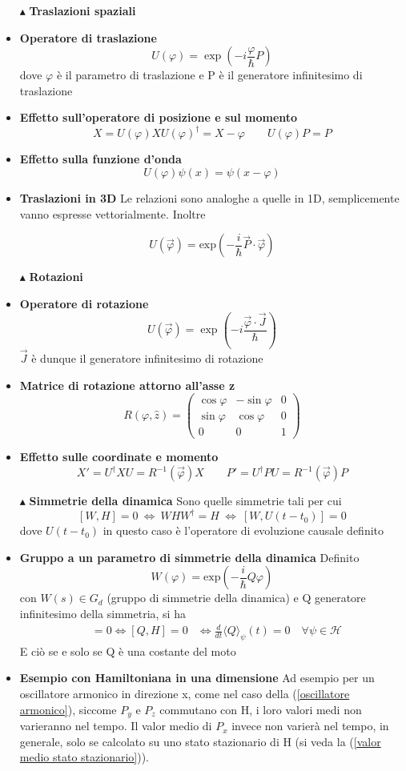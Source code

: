 \documentclass{book}
\newcommand{\g}{\textbf}
\newcommand{\e}{\begin{equation}}
\newcommand{\ex}{\end{equation} }
\renewcommand{\it}{\item[$\cdot$]}
\begin{document}
\begin{multicols}{4}
\begin{itemize}
\item [$\blacktriangle$] \g{Traslazioni spaziali}
    \it \g{Operatore di traslazione}
        \e{U(\varphi) = \exp\left(-i\frac{\varphi}{\hbar} P\right)} \ex
        dove $\varphi$ è il parametro di traslazione e P è il generatore infinitesimo di traslazione
        \it \g{Effetto sull'operatore di posizione e sul momento}
        \e{X = U(\varphi)XU(\varphi)^{\dagger} = X -\varphi \qquad U(\varphi) P = P} \ex
    \it \g{Effetto sulla funzione d'onda}
        \e{U(\varphi)\psi(x) = \psi(x - \varphi)} \ex
    \it \g{Traslazioni in 3D}
    Le relazioni sono analoghe a quelle in 1D, semplicemente vanno espresse vettorialmente. Inoltre
    
     \e{U(\vec{\varphi}) = \text{exp}\left(-\frac{i}{\hbar}\vec{P}\cdot \vec{\varphi}\right)}\ex
\item [$\blacktriangle$] \g{Rotazioni}
    \it \g{Operatore di rotazione}
        \e{U(\vec{\varphi}) = \exp\left(-i\frac{\vec{\varphi} \cdot \vec{J}}{\hbar}\right)} \ex
        $\vec{J}$ è dunque il generatore infinitesimo di rotazione
        
    \it \g{Matrice di rotazione attorno all'asse z}
        \e{R(\varphi, \hat{z}) = 
        \begin{pmatrix}
            \cos\varphi & -\sin\varphi & 0\\ 
            \sin\varphi & \cos\varphi & 0 \\
            0 & 0 & 1
        \end{pmatrix}} \ex
    \it \g{Effetto sulle coordinate e momento}
        \e{X' = U^\dagger X U = R^{-1}(\vec{\varphi}) X \qquad P' = U^\dagger P U = R^{-1}(\vec{\varphi}) P} \ex

    \item[$\blacktriangle$] \g{Simmetrie della dinamica}
Sono quelle simmetrie tali per cui
\e{[W,H] = 0 \ \iff \ WHW^{\dagger} = H \ \iff \ [W, U(t-t_{0})] = 0}\ex
dove $U(t-t_{0})$ in questo caso è l'operatore di evoluzione causale definito 
\it \g{Gruppo a un parametro di simmetrie della dinamica}
Definito 
\e{W(\varphi) = \text{exp}\left(-\frac{i}{\hbar}Q\varphi\right)}\ex con $W(s) \in G_{d}$ (gruppo di simmetrie della dinamica) e Q generatore infinitesimo della simmetria, si ha 
\begin{align}
    [W(s), H] &= 0 \iff [Q, H] = 0 
    &\iff \frac{d}{dt} \langle Q \rangle_{\psi}(t) = 0 \quad \forall \psi \in \mathcal{H}
\end{align}
E ciò se e solo se Q è una costante del moto
\it \g{Esempio con Hamiltoniana in una dimensione}
Ad esempio per un oscillatore armonico in direzione x, come nel caso della (\ref{oscillatore armonico}), siccome $P_{y}$ e $P_{z}$ commutano con H, i loro valori medi non varieranno nel tempo. Il valor medio di $P_{x}$ invece non varierà nel tempo, in generale, solo se calcolato su uno stato stazionario di H (si veda la (\ref{valor medio stato stazionario})).


\end{itemize}
\end{multicols}
\end{document}
